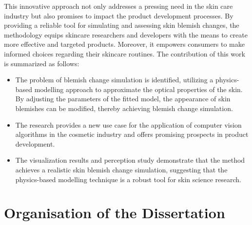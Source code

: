 \begin{spacing}{1.5}
This innovative approach not only addresses a pressing need in the skin care industry but also promises to impact the product development processes. By providing a reliable tool for simulating and assessing skin blemish changes, the methodology equips skincare researchers and developers with the means to create more effective and targeted products. Moreover, it empowers consumers to make informed choices regarding their skincare routines. The contribution of this work is summarized as follows:
\begin{itemize}
    \item The problem of blemish change simulation is identified, utilizing a physics-based modelling approach to approximate the optical properties of the skin. By adjusting the parameters of the fitted model, the appearance of skin blemishes can be modified, thereby achieving blemish change simulation.
    \item The research provides a new use case for the application of computer vision algorithms in the cosmetic industry and offers promising prospects in product development.
    \item The visualization results and perception study demonstrate that the method achieves a realistic skin blemish change simulation, suggesting that the physics-based modelling technique is a robust tool for skin science research.
\end{itemize}

\section{Organisation of the Dissertation}


\end{spacing}
